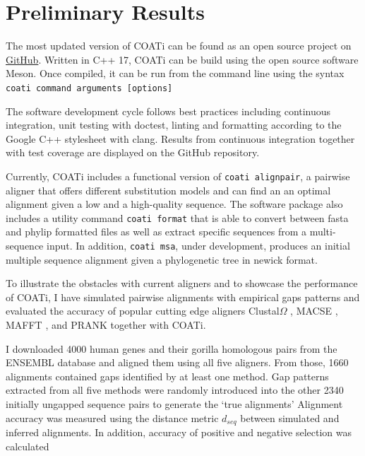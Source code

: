 \section{Preliminary Results}


The most updated version of COATi can be found as an open source project on
\href{https://www.github.com/jgarciamesa/coati}{GitHub}.
Written in C++ 17, COATi can be build using the open source software Meson.
Once compiled, it can be run from the command line using the syntax
\texttt{coati command arguments [options]}

The software development cycle follows best practices including continuous
integration, unit testing with doctest, linting and formatting according to the
Google C++ stylesheet with clang.
Results from continuous integration together with test coverage are displayed
on the GitHub repository.

Currently, COATi includes a functional version of \texttt{coati alignpair}, a
pairwise aligner that offers different substitution models and can find an
an optimal alignment given a low and a high-quality sequence.
The software package also includes a utility command \verb|coati format| that is
able to convert between fasta and phylip formatted files as well as extract
specific sequences from a multi-sequence input.
In addition, \texttt{coati msa}, under development, produces an initial multiple
sequence alignment given a phylogenetic tree in newick format.

To illustrate the obstacles with current aligners and to showcase the
performance of COATi, I have simulated pairwise alignments with empirical gaps
patterns and evaluated the accuracy of popular cutting edge aligners
Clustal$\Omega$ \parencite{clustal_omega_sievers_2011}, MACSE
\parencite{ranwez_macse_2011}, MAFFT \parencite{mafft_katoh_2002}, and PRANK
\parencite{prank_loytynoja_2014} together with COATi.

I downloaded 4000 human genes and their gorilla homologous pairs from the
ENSEMBL database \parencite{ensembl_hubbard_2002} and aligned them using all
five aligners.
From those, 1660 alignments contained gaps identified by at least one method.
Gap patterns extracted from all five methods were randomly introduced into the
other 2340 initially ungapped sequence pairs to generate the `true alignments'
Alignment accuracy was measured using the distance metric $d_{seq}$
\parencite{metrics_blackburne_whelan_2011} between simulated and inferred
alignments.
In addition, accuracy of positive and negative selection was calculated %

